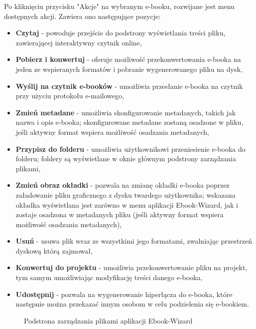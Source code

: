 Po kliknięciu przycisku "Akcje" na wybranym e-booku, rozwijane jest menu dostępnych akcji. Zawiera ono następujące pozycje:

\begin{itemize}
    \item \textbf{Czytaj} - powoduje przejście do podstrony wyświetlania treści pliku, zawierającej interaktywny czytnik online,
    \item \textbf{Pobierz i konwertuj} - oferuje możliwość przekonwertowania e-booka na jeden ze wspieranych formatów i pobranie wygenerowanego pliku na dysk,
    \item \textbf{Wyślij na czytnik e-booków} - umożliwia przesłanie e-booka na czytnik przy użyciu protokołu e-mailowego,
    \item \textbf{Zmień metadane} - umożliwia skonfigurowanie metadanych, takich jak nazwa i opis e-booka; skonfigurowane metadane zostaną osadzone w pliku, jeśli aktywny format wspiera możliwość osadzania metadanych,
    \item \textbf{Przypisz do folderu} - umożliwia użytkownikowi przeniesienie e-booka do folderu; foldery są wyświetlane w oknie głównym podstrony zarządzania plikami,
    \item \textbf{Zmień obraz okładki} - pozwala na zmianę okładki e-booka poprzez załadowanie pliku graficznego z dysku twardego użytkownika; wskazana okładka wyświetlana jest zarówno w menu aplikacji Ebook-Wizard, jak i zostaje osadzona w metadanych pliku (jeśli aktywny format wspiera możliwość osadzania metadanych),
    \item \textbf{Usuń} - usuwa plik wraz ze wszystkimi jego formatami, zwalniając przestrzeń dyskową którą zajmował,
    \item \textbf{Konwertuj do projektu} - umożliwia przekonwertowanie pliku na projekt, tym samym umożliwiając modyfikację treści danego e-booka,
    \item \textbf{Udostępnij} - pozwala na wygenerowanie hiperłącza do e-booka, które następnie można przekazać innym osobom w celu podzielenia się e-bookiem.
\end{itemize}

\begin{figure}[h]
    \centering
    \setlength{\fboxsep}{0pt}
    \setlength{\fboxrule}{0.4pt}
    \caption{Podstrona zarządzania plikami aplikacji Ebook-Wizard}
    \label{fig:page_file_management}
\end{figure}

